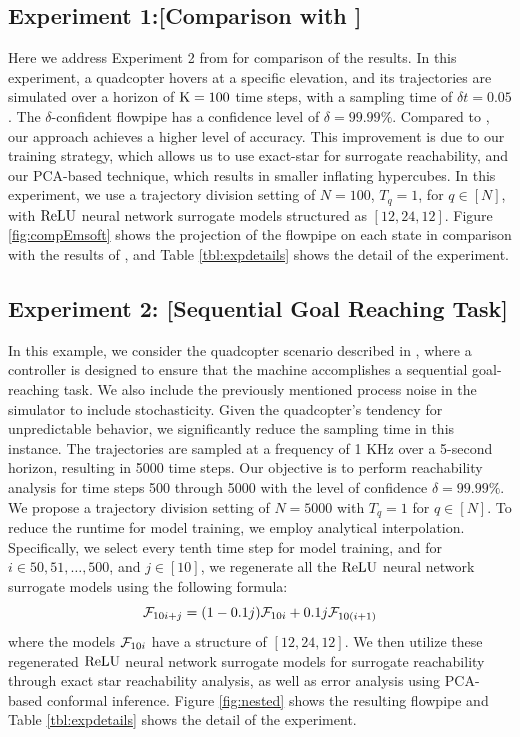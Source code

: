 \subsection{Experiment 1:[Comparison with \cite{hashemi2024statistical}]} Here we address Experiment 2 from \cite{hashemi2024statistical} for comparison of the results. In this experiment, a quadcopter hovers at a specific elevation, and its trajectories are simulated over a horizon of $\mathrm{K} = 100$ time steps, with a sampling time of $\delta t = 0.05$. The $\delta$-confident flowpipe has a confidence level of $\delta = 99.99\%$. Compared to \cite{hashemi2024statistical}, our approach achieves a higher level of accuracy. This improvement is due to our training strategy, which allows us to use exact-star for surrogate reachability, and our PCA-based technique, which results in smaller inflating hypercubes. In this experiment, we use a trajectory division setting of $N=100$, $T_q=1$, for $q\in[N]$, with $\mathrm{ReLU}$ neural network surrogate models structured as $[12, 24, 12]$. Figure \ref{fig:compEmsoft} shows the projection of the flowpipe on each state in comparison with the results of \cite{hashemi2024statistical}, and Table \ref{tbl:expdetails} shows the detail of the experiment.

\subsection{Experiment 2: [Sequential Goal Reaching Task]} In this example, we consider the quadcopter scenario described in \cite{hashemi2024scaling}, where a controller is designed to ensure that the machine accomplishes a sequential goal-reaching task. We also include the previously mentioned process noise in the simulator to include stochasticity. Given the quadcopter's tendency for unpredictable behavior, we significantly reduce the sampling time in this instance. The trajectories are sampled at a frequency of 1 KHz over a 5-second horizon, resulting in 5000 time steps. Our objective is to perform reachability analysis for time steps 500 through 5000 with the level of confidence $\delta = 99.99\%$. We propose a trajectory division setting of $N=5000$ with $T_q = 1$ for $q \in [N]$. To reduce the runtime for model training, we employ analytical interpolation. Specifically, we select every tenth time step for model training, and for $i \in 50, 51, \ldots, 500$, and $j \in [10]$, we regenerate all the $\mathrm{ReLU}$ neural network surrogate models using the following formula:
\begin{equation}\label{eq:strategy}
\mathcal{F}_{10i+j} = (1-0.1j)\mathcal{F}_{10i} + 0.1j\mathcal{F}_{10(i+1)} 
\end{equation}
where the models $\mathcal{F}_{10i}$ have a structure of $[12, 24, 12]$. We then utilize these regenerated $\mathrm{ReLU}$ neural network surrogate models for surrogate reachability through exact star reachability analysis, as well as error analysis using PCA-based conformal inference. Figure \ref{fig:nested} shows the resulting flowpipe and Table \ref{tbl:expdetails} shows the detail of the experiment.

